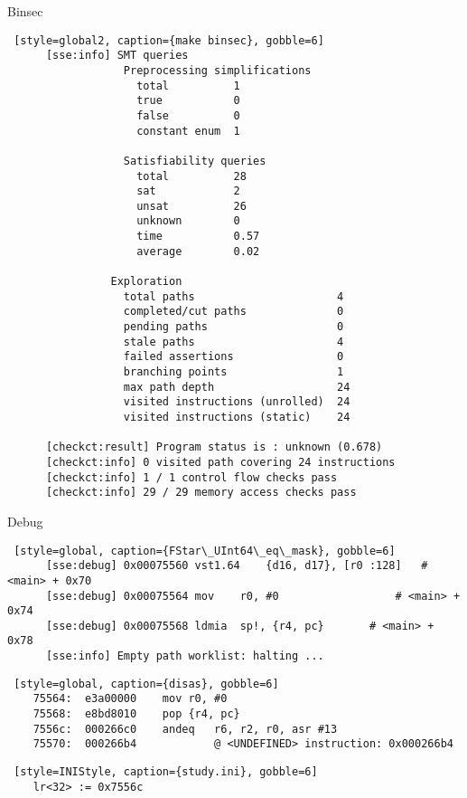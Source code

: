 \documentclass[A4,svgnames,9pt,aspectratio=169]{beamer}
\begin{document}
\begin{frame}[fragile]{Binsec}
  \begin{lstlisting} [style=global2, caption={make binsec}, gobble=6]
      [sse:info] SMT queries
                  Preprocessing simplifications
                    total          1
                    true           0
                    false          0
                    constant enum  1
                  
                  Satisfiability queries
                    total          28
                    sat            2
                    unsat          26
                    unknown        0
                    time           0.57
                    average        0.02
                  
                Exploration
                  total paths                      4
                  completed/cut paths              0
                  pending paths                    0
                  stale paths                      4
                  failed assertions                0
                  branching points                 1
                  max path depth                   24
                  visited instructions (unrolled)  24
                  visited instructions (static)    24

      [checkct:result] Program status is : unknown (0.678)
      [checkct:info] 0 visited path covering 24 instructions
      [checkct:info] 1 / 1 control flow checks pass
      [checkct:info] 29 / 29 memory access checks pass
    \end{lstlisting}
\end{frame}


\begin{frame}[fragile]{Debug}
  \begin{lstlisting} [style=global, caption={FStar\_UInt64\_eq\_mask}, gobble=6]
      [sse:debug] 0x00075560 vst1.64	{d16, d17}, [r0 :128]	# <main> + 0x70
      [sse:debug] 0x00075564 mov	r0, #0               	# <main> + 0x74
      [sse:debug] 0x00075568 ldmia	sp!, {r4, pc}      	# <main> + 0x78
      [sse:info] Empty path worklist: halting ...
  \end{lstlisting}
  \pause
  \begin{lstlisting} [style=global, caption={disas}, gobble=6]
    75564:	e3a00000 	mov	r0, #0
    75568:	e8bd8010 	pop	{r4, pc}
    7556c:	000266c0 	andeq	r6, r2, r0, asr #13
    75570:	000266b4 			@ <UNDEFINED> instruction: 0x000266b4
  \end{lstlisting}
  \pause
  \begin{lstlisting} [style=INIStyle, caption={study.ini}, gobble=6]
    lr<32> := 0x7556c
  \end{lstlisting}
\end{frame}
\end{document}
